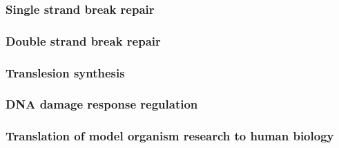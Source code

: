 \subsubsection*{Single strand break repair}

\subsubsection*{Double strand break repair}

\subsubsection*{Translesion synthesis}

\subsubsection*{DNA damage response regulation}

\subsubsection{Translation of model organism research to human biology}

